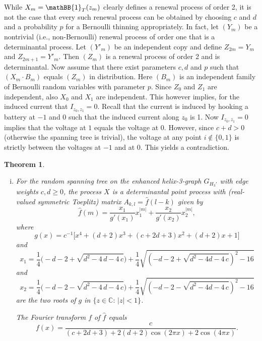 \documentclass[11pt]{article}
\providecommand{\1}{\mathBB{1}}
\newcommand{\C}{{\mathbb{C}}}
\def\hatf{\widehat f}
\newtheorem{theorem}[proposition]{Theorem}
\begin{document}
While $X_m=\1_T(z_m)$ clearly defines a renewal process of order 2, it is not the case that every such renewal process can be obtained by choosing $c$ and $d$ and a probability $p$ for a Bernoulli thinning appropriately. In fact, let $(Y_m)$ be a nontrivial (i.e., non-Bernoulli) renewal process of order one that is a determinantal process. Let $(Y'_m)$ be an independent copy and define $Z_{2m}=Y_m$ and $Z_{2m+1}=Y'_m$. Then $(Z_m)$ is a renewal process of order 2 and is determinantal. Now assume that there exist parameters $c,d$ and $p$ such that $(X_m\cdot B_m)$ equals $(Z_m)$ in distribution. Here $(B_m)$ is an independent family of Bernoulli random variables with parameter $p$. Since $Z_0$ and $Z_1$ are independent, also $X_0$ and $X_1$ are independent. This however implies, for the induced current that $I_{z_0,z_1}=0$. Recall that the current is induced by hooking a battery at $-1$ and $0$ such that the induced current along $z_0$ is 1. Now $I_{z_0,z_1}=0$ implies that the voltage at $1$ equals the voltage at $0$. However, since $c+d>0$ (otherwise the spanning tree is trivial), the voltage at any point $i\not\in\{0,1\}$ is strictly between the voltages at $-1$ and at $0$. This yields a contradiction.



\begin{theorem}
\label{T4}
\begin{enumerate}[(i)]
\item
For the random spanning tree on the enhanced helix-3-graph $G_{H_3'}$ with edge weights $c,d\geq0$, the process $X$ is a determinantal point process with (real-valued symmetric Toeplitz) matrix
$A_{k,l}=\hatf(l-k)$ given by
\begin{equation}
\label{E1.23}
\hatf(m)=\frac{x_1}{g'(x_1)}x_1^{|m|}+\frac{x_2}{g'(x_2)}x_2^{|m|},
\end{equation}
where
\begin{equation}
\label{E1.24}
g(x)=c^{-1}\big[x^4+(d+2)x^3+(c+2d+3)x^2+(d+2)x+1]
\end{equation}
and
$$x_{1}=\frac{1}{4}\big(-d-2+\sqrt {{d}^{2}-4\,d-4\,c}\big)+\frac14\sqrt { \left( -d
-2+\sqrt {{d}^{2}-4d-4\,c} \right) ^{2}-16}
$$
and
$$x_{2}=\frac{1}{4}\big(-d-2-\sqrt {{d}^{2}-4\,d-4\,c}\big)+\frac14\sqrt { \left( -d
-2-\sqrt {{d}^{2}-4d-4\,c} \right) ^{2}-16}
$$
are the two roots of $g$ in $\{z\in\C:\,|z|<1\}$.

 The Fourier transform $f$ of $\hatf$ equals
\begin{equation}
\label{E1.25}
f(x)=\frac{c}{(c+2d+3)+2(d+2)\cos(2\pi x)+2\cos(4\pi x)}.
\end{equation}
\end{enumerate}
\end{theorem}
\end{document}
